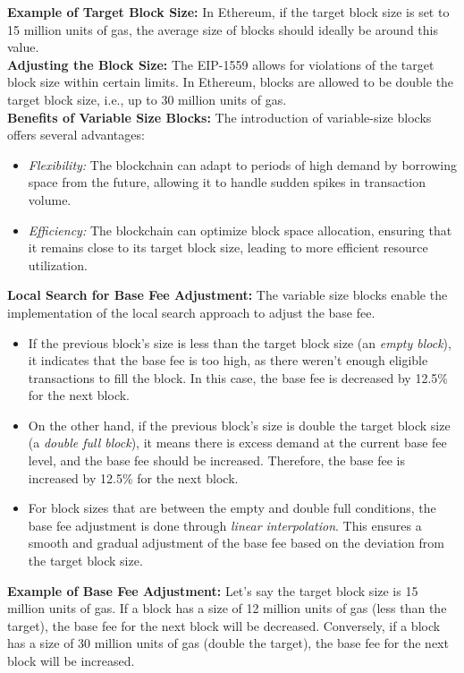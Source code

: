 \noindent
\textbf{Example of Target Block Size:}
In Ethereum, if the target block size is set to 15 million units of gas, the average size of blocks should ideally be around this value.\\

\noindent
\textbf{Adjusting the Block Size:}
The EIP-1559 allows for violations of the target block size within certain limits. In Ethereum, blocks are allowed to be double the target block size, i.e., up to 30 million units of gas.\\

\noindent
\textbf{Benefits of Variable Size Blocks:}
The introduction of variable-size blocks offers several advantages:
\begin{itemize}
    \item \textit{Flexibility:} The blockchain can adapt to periods of high demand by borrowing space from the future, allowing it to handle sudden spikes in transaction volume.
    \item \textit{Efficiency:} The blockchain can optimize block space allocation, ensuring that it remains close to its target block size, leading to more efficient resource utilization.
\end{itemize}

\noindent
\textbf{Local Search for Base Fee Adjustment:}
The variable size blocks enable the implementation of the local search approach to adjust the base fee. 
\begin{itemize}
    \item If the previous block's size is less than the target block size (an \textit{empty block}), it indicates that the base fee is too high, as there weren't enough eligible transactions to fill the block. In this case, the base fee is decreased by 12.5\% for the next block.
    \item On the other hand, if the previous block's size is double the target block size (a \textit{double full block}), it means there is excess demand at the current base fee level, and the base fee should be increased. Therefore, the base fee is increased by 12.5\% for the next block.
    \item For block sizes that are between the empty and double full conditions, the base fee adjustment is done through \textit{linear interpolation}. This ensures a smooth and gradual adjustment of the base fee based on the deviation from the target block size.
\end{itemize}

\noindent
\textbf{Example of Base Fee Adjustment:}
Let's say the target block size is 15 million units of gas. If a block has a size of 12 million units of gas (less than the target), the base fee for the next block will be decreased. Conversely, if a block has a size of 30 million units of gas (double the target), the base fee for the next block will be increased.\\


